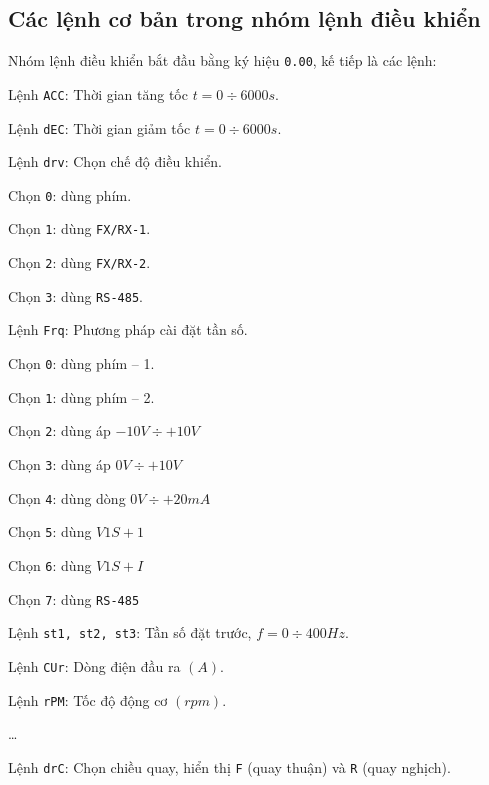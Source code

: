 \documentclass[13pt,a4paper]{extarticle}
\begin{document}
\subsection{Các lệnh cơ bản trong nhóm lệnh điều khiển}
Nhóm lệnh điều khiển bắt đầu bằng ký hiệu \verb|0.00|, kế tiếp là các lệnh:
\begin{list}{--}{}
\item Lệnh \verb|ACC|: Thời gian tăng tốc $t = 0 \div 6000s$.
\item Lệnh \verb|dEC|: Thời gian giảm tốc $t = 0 \div 6000s$.
\item Lệnh \verb|drv|: Chọn chế độ điều khiển. 
\begin{list}{+}{}
\begin{multicols}{2}
\item Chọn \verb|0|: dùng phím.
\item Chọn \verb|1|: dùng \verb|FX/RX-1|.
\item Chọn \verb|2|: dùng \verb|FX/RX-2|.
\item Chọn \verb|3|: dùng \verb|RS-485|.
\end{multicols}
\end{list}
\item Lệnh \verb|Frq|: Phương pháp cài đặt tần số.
\begin{list}{+}{}
\begin{multicols}{2}
\item Chọn \verb|0|: dùng phím -- 1.
\item Chọn \verb|1|: dùng phím -- 2.
\item Chọn \verb|2|: dùng áp $-10V \div +10V$
\item Chọn \verb|3|: dùng áp $0V \div +10V$
\item Chọn \verb|4|: dùng dòng $0V \div +20mA$
\item Chọn \verb|5|: dùng $V1S+1$
\item Chọn \verb|6|: dùng $V1S+I$
\item Chọn \verb|7|: dùng \verb|RS-485|
\end{multicols}
\end{list}
\item Lệnh \verb|st1, st2, st3|: Tần số đặt trước, $f = 0 \div 400Hz$.
\item Lệnh \verb|CUr|: Dòng điện đầu ra $(A)$.
\item Lệnh \verb|rPM|: Tốc độ động cơ $(rpm)$.
\item \ldots
\item Lệnh \verb|drC|: Chọn chiều quay, hiển thị \verb|F| (quay thuận) và \verb|R| (quay nghịch).
\end{list}
\end{document}
